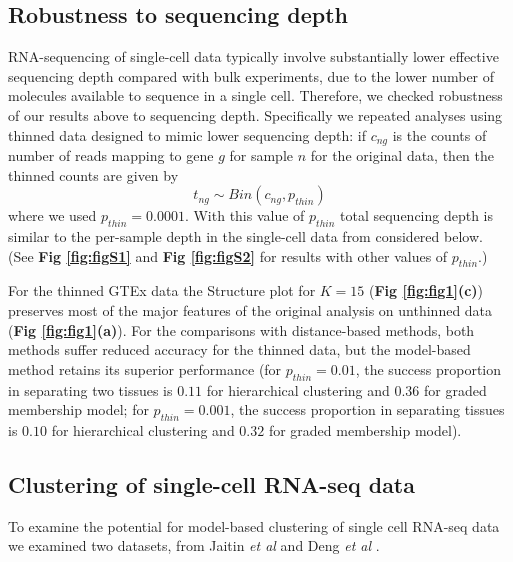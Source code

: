 \subsection{Robustness to sequencing depth}

RNA-sequencing of single-cell data typically involve substantially lower effective sequencing depth compared with bulk experiments, due to the lower number of molecules available to sequence in a single cell.
Therefore, we checked robustness of our results above to sequencing depth. Specifically we repeated analyses using thinned data designed to mimic lower sequencing depth: if $c_{ng}$ is the counts of number of reads mapping to gene $g$ for sample $n$ for the original data, then the thinned counts are given by 
\begin{equation}
t_{ng} \sim Bin (c_{ng}, p_{thin})
\end{equation}
where we used $p_{thin} =0.0001$. With this value of $p_{thin}$ total sequencing depth is similar to the per-sample depth in the 
single-cell data from \cite{Jaitin2014} considered below. (See  \textbf{Fig \ref{fig:figS1}} and \textbf{Fig \ref{fig:figS2}} for results with other values of $p_{thin}$.) 

For the thinned GTEx data the Structure plot for $K=15$ (\textbf{Fig \ref{fig:fig1}(c)}) preserves most of the major features of the original analysis on unthinned data (\textbf{Fig \ref{fig:fig1}(a)}). For the comparisons with distance-based methods, both methods suffer reduced accuracy for the thinned data, but the model-based method retains its superior performance (for $p_{thin}=0.01$, the success proportion in separating two tissues is $0.11$  for hierarchical clustering and $0.36$ for graded membership model; for $p_{thin}=0.001$, the success proportion in separating tissues is  $0.10$ for hierarchical clustering and $0.32$ for graded membership model).  



\subsection{Clustering of single-cell RNA-seq data}

To examine the potential for model-based clustering of single cell RNA-seq data we examined two datasets, from Jaitin \textit{et al} \cite{Jaitin2014} and Deng \textit{et al} \cite{Deng2014}.  

